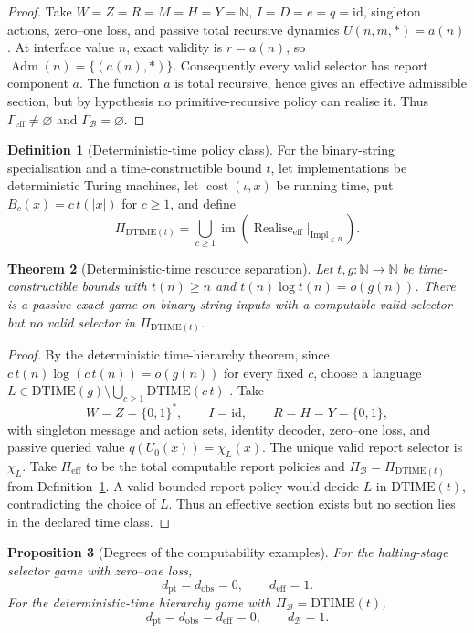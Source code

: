 \documentclass[11pt]{article}
\theoremstyle{plain}
\newtheorem{theorem}{Theorem}[section]
\newtheorem{proposition}[theorem]{Proposition}
\theoremstyle{definition}
\newtheorem{definition}[theorem]{Definition}
\theoremstyle{remark}
\newcommand{\N}{\mathbb{N}}
\newcommand{\im}{\operatorname{im}}
\newcommand{\Adm}{\operatorname{Adm}}
\newcommand{\realise}{\operatorname{Realise}}
\begin{document}
\begin{proof}
Take $W=Z=R=M=H=Y=\N$, $I=D=e=q=\mathrm{id}$, singleton actions, zero--one
loss, and passive total recursive dynamics
$U(n,m,\ast)=a(n)$. At interface value $n$, exact validity is
$r=a(n)$, so $\Adm(n)=\{(a(n),\ast)\}$. Consequently every valid selector has
report component $a$. The function $a$ is total recursive, hence gives an
effective admissible section, but by hypothesis no primitive-recursive policy
can realise it. Thus $\Gamma_{\mathrm{eff}}\ne\varnothing$ and
$\Gamma_{\mathcal B}=\varnothing$.
\end{proof}

\begin{definition}[Deterministic-time policy class]\label{def:dtime-class}
For the binary-string specialisation and a time-constructible bound $t$, let
implementations be deterministic Turing machines, let
$\operatorname{cost}(\iota,x)$ be running time, put
$B_c(x)=c\,t(|x|)$ for $c\ge1$, and define
\[
\Pi_{\mathrm{DTIME}(t)}
=\bigcup_{c\ge1}
\im\!\left(
\realise_{\mathrm{eff}}|_{\mathrm{Impl}_{\le B_c}}
\right).
\]
\end{definition}

\begin{theorem}[Deterministic-time resource separation]\label{thm:timeR}
Let $t,g:\N\to\N$ be time-constructible bounds with $t(n)\ge n$ and
$t(n)\log t(n)=o(g(n))$. There is a passive exact game on binary-string inputs
with a computable valid selector but no valid selector in
$\Pi_{\mathrm{DTIME}(t)}$.
\end{theorem}

\begin{proof}
By the deterministic time-hierarchy theorem, since
$c\,t(n)\log(c\,t(n))=o(g(n))$ for every fixed $c$, choose a language
$L\in\mathrm{DTIME}(g)\setminus\bigcup_{c\ge1}\mathrm{DTIME}(c\,t)$
\cite{arorabarak}. Take
\[
W=Z=\{0,1\}^*,\qquad I=\mathrm{id},\qquad
R=H=Y=\{0,1\},
\]
with singleton message and action sets, identity decoder, zero--one loss, and
passive queried value $q(U_0(x))=\chi_L(x)$. The unique valid report selector is
$\chi_L$. Take $\Pi_{\mathrm{eff}}$ to be the total computable report policies
and $\Pi_{\mathcal B}=\Pi_{\mathrm{DTIME}(t)}$ from
Definition~\ref{def:dtime-class}. A valid bounded report policy would decide
$L$ in $\mathrm{DTIME}(t)$, contradicting the choice of $L$. Thus an effective
section exists but no section lies in the declared time class.
\end{proof}

\begin{proposition}[Degrees of the computability examples]\label{prop:example-degrees}
For the halting-stage selector game with zero--one loss,
\[
d_{\mathrm{pt}}=d_{\mathrm{obs}}=0,
\qquad
d_{\mathrm{eff}}=1.
\]
For the deterministic-time hierarchy game with
$\Pi_{\mathcal B}=\mathrm{DTIME}(t)$,
\[
d_{\mathrm{pt}}=d_{\mathrm{obs}}=d_{\mathrm{eff}}=0,
\qquad d_{\mathcal B}=1.
\]
\end{proposition}
\end{document}
